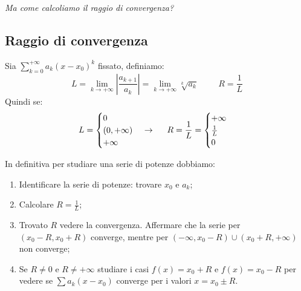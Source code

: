 \textit{Ma come calcoliamo il raggio di convergenza?}

\subsection*{Raggio di convergenza}
\begin{thm}
    Sia $\sum^{+\infty}_{k=0}a_k(x-x_0)^k$ fissato, definiamo:
    \begin{equation*}
        L=\lim_{k\to+\infty}|\frac{a_{k+1}}{a_k}|=\lim_{k\to+\infty}\sqrt[k]{a_k}\hspace{1cm}R=\frac{1}{L}
    \end{equation*}
    Quindi se:
    $$L=\begin{cases}0\\(0,+\infty)\\+\infty\end{cases}\to\hspace{0.5cm} R=\frac{1}{L}=\begin{cases}+\infty\\\frac{1}{L}\\0\end{cases}$$
\end{thm}

In definitiva per studiare una serie di potenze dobbiamo:
\begin{enumerate}
    \item Identificare la serie di potenze: trovare $x_0$ e $a_k$;
    \item Calcolare $R=\frac{1}{L}$;
    \item Trovato $R$ vedere la convergenza. Affermare che la serie per $(x_0-R,x_0+R)$ converge, mentre per $(-\infty, x_0-R)\cup(x_0+R,+\infty)$ non converge;
    \item Se $R\neq0$ e $R\neq+\infty$ studiare i casi $f(x)=x_0+R$ e $f(x)=x_0-R$ per vedere se $\sum a_k(x-x_0)$ converge per i valori $x=x_0\pm R$.
\end{enumerate}

